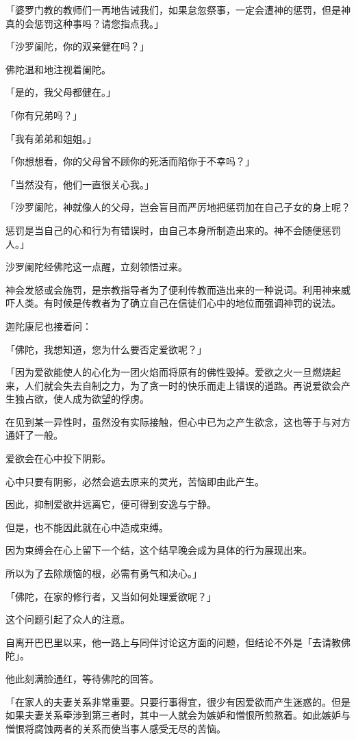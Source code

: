 \documentclass[twoside,openany]{book}
\begin{document}
「婆罗门教的教师们一再地告诫我们，如果怠忽祭事，一定会遭神的惩罚，但是神真的会惩罚这种事吗？请您指点我。」

「沙罗阑陀，你的双亲健在吗？」

佛陀温和地注视着阑陀。

「是的，我父母都健在。」

「你有兄弟吗？」

「我有弟弟和姐姐。」

「你想想看，你的父母曾不顾你的死活而陷你于不幸吗？」

「当然没有，他们一直很关心我。」

「沙罗阑陀，神就像人的父母，岂会盲目而严厉地把惩罚加在自己子女的身上呢？

惩罚是当自己的心和行为有错误时，由自己本身所制造出来的。神不会随便惩罚人。」

沙罗阑陀经佛陀这一点醒，立刻领悟过来。

神会发怒或会施罚，是宗教指导者为了便利传教而造出来的一种说词。利用神来威吓人类。有时候是传教者为了确立自己在信徒们心中的地位而强调神罚的说法。

迦陀康尼也接着问：

「佛陀，我想知道，您为什么要否定爱欲呢？」

「因为爱欲能使人的心化为一团火焰而将原有的佛性毁掉。爱欲之火一旦燃烧起来，人们就会失去自制之力，为了贪一时的快乐而走上错误的道路。再说爱欲会产生独占欲，使人成为欲望的俘虏。

在见到某一异性时，虽然没有实际接触，但心中已为之产生欲念，这也等于与对方通奸了一般。

爱欲会在心中投下阴影。

心中只要有阴影，必然会遮去原来的灵光，苦恼即由此产生。

因此，抑制爱欲并远离它，便可得到安逸与宁静。

但是，也不能因此就在心中造成束缚。

因为束缚会在心上留下一个结，这个结早晚会成为具体的行为展现出来。

所以为了去除烦恼的根，必需有勇气和决心。」

「佛陀，在家的修行者，又当如何处理爱欲呢？」

这个问题引起了众人的注意。

自离开巴巴里以来，他一路上与同伴讨论这方面的问题，但结论不外是「去请教佛陀」。

他此刻满脸通红，等待佛陀的回答。

「在家人的夫妻关系非常重要。只要行事得宜，很少有因爱欲而产生迷惑的。但是如果夫妻关系牵涉到第三者时，其中一人就会为嫉妒和憎恨所煎熬着。如此嫉妒与憎恨将腐蚀两者的关系而使当事人感受无尽的苦恼。
\end{document}
